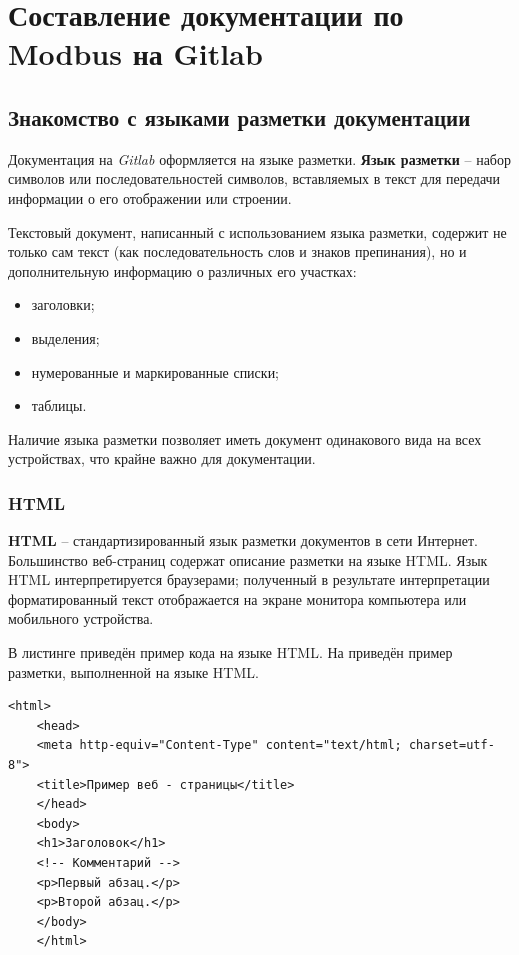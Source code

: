 \documentclass[../AISTR.tex]{subfiles}
\begin{document}
\section{Составление документации по Modbus на Gitlab}
\subsection{Знакомство с языками разметки документации}
Документация на \textit{Gitlab} оформляется на языке разметки. \textbf{Язык разметки} -- набор символов или последовательностей символов, вставляемых в текст для передачи информации о его отображении или строении. 

Текстовый документ, написанный с использованием языка разметки, содержит не только сам текст (как последовательность слов и знаков препинания), но и дополнительную информацию о различных его участках:
\begin{itemize}
	\item заголовки;
	\item выделения;
	\item нумерованные и маркированные списки;
	\item таблицы.
\end{itemize}
Наличие языка разметки позволяет иметь документ одинакового вида на всех устройствах, что крайне важно для документации.
\subsubsection{HTML}
\textbf{HTML} -- стандартизированный язык разметки документов в сети Интернет. Большинство веб-страниц содержат описание разметки на языке HTML. Язык HTML интерпретируется браузерами; полученный в результате интерпретации форматированный текст отображается на экране монитора компьютера или мобильного устройства.

В листинге  приведён пример кода на языке HTML. На  приведён пример разметки, выполненной на языке HTML.

\begin{lstlisting}[caption=Пример кода на языке HTML,captionpos=b, label={list:html}]
	<html>
	<head>
	<meta http-equiv="Content-Type" content="text/html; charset=utf-8">
	<title>Пример веб - страницы</title>
	</head>
	<body>
	<h1>Заголовок</h1>
	<!-- Комментарий -->
	<p>Первый абзац.</p>
	<p>Второй абзац.</p>
	</body>
	</html>
\end{lstlisting}
\end{document}
